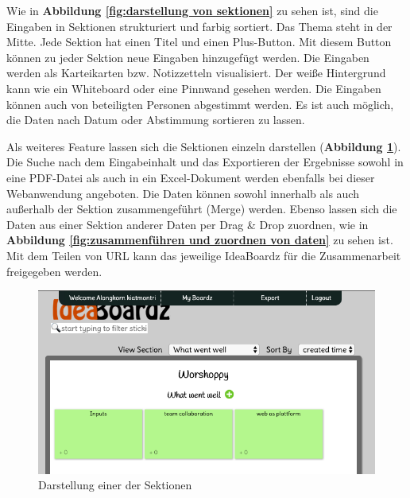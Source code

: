 Wie in \textbf{Abbildung \ref{fig:darstellung von sektionen}} zu sehen ist, sind die Eingaben in Sektionen strukturiert und farbig sortiert. Das Thema steht in der Mitte. Jede Sektion hat einen Titel und einen Plus-Button. Mit diesem Button können zu jeder Sektion neue Eingaben hinzugefügt werden. Die Eingaben werden als Karteikarten bzw. Notizzetteln visualisiert. Der weiße Hintergrund kann wie ein Whiteboard oder eine Pinnwand gesehen werden. Die Eingaben können auch von beteiligten Personen abgestimmt werden. Es ist auch möglich, die Daten nach Datum oder Abstimmung sortieren zu lassen.\bigskip

Als weiteres Feature lassen sich die Sektionen einzeln darstellen (\textbf{Abbildung \ref{fig:darstellung einer der sektionen}}). Die Suche nach dem Eingabeinhalt und das Exportieren der Ergebnisse sowohl in eine PDF-Datei als auch in ein Excel-Dokument werden ebenfalls bei dieser Webanwendung angeboten. Die Daten können sowohl innerhalb als auch außerhalb der Sektion zusammengeführt (Merge) werden. Ebenso lassen sich die Daten aus einer Sektion anderer Daten per Drag \& Drop zuordnen, wie in \textbf{Abbildung \ref{fig:zusammenführen und zuordnen von daten}} zu sehen ist. Mit dem Teilen von URL kann das jeweilige IdeaBoardz für die Zusammenarbeit freigegeben werden.

\begin{figure}[H]
  \begin{center}
    \includegraphics[scale=0.4]{img/ideaBoardz3}
	\caption{Darstellung einer der Sektionen} 
	\label{fig:darstellung einer der sektionen}
  \end{center}   
\end{figure}

